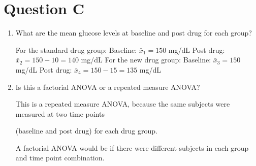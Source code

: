 \documentclass{article}
\begin{document}
\section{Question C}
\begin{enumerate}
\item What are the mean glucose levels at baseline and post drug for each group?

For the standard drug group:
Baseline: $\bar{x}_1 = 150$ mg/dL
Post drug: $\bar{x}_2 = 150 - 10 = 140$ mg/dL
For the new drug group:
Baseline: $\bar{x}_3 = 150$ mg/dL
Post drug: $\bar{x}_4 = 150 - 15 = 135$ mg/dL
\item Is this a factorial ANOVA or a repeated measure ANOVA?

This is a repeated measure ANOVA, because the same subjects were measured at two time points

(baseline and post drug) for each drug group.

A factorial ANOVA would be if there were different subjects in each group and time point combination.
\end{enumerate}
\end{document}
